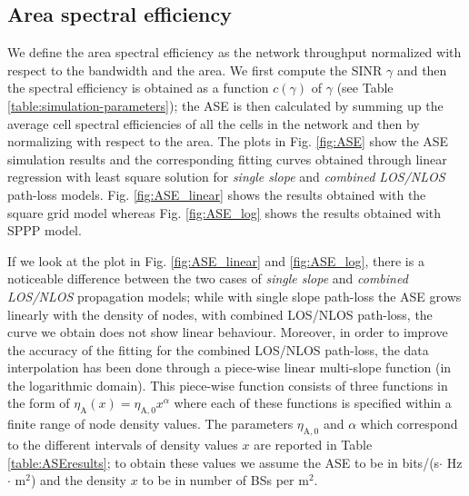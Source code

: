 \documentclass[twocoumn]{IEEEtran}
\begin{document}
\vspace{-5mm}
\subsection{Area spectral efficiency} \label{sub:Area_Spectral_Efficiency}

We define the area spectral efficiency as the network throughput normalized with respect to the bandwidth and the area. We first compute the SINR $\gamma$ and then the spectral efficiency is obtained as a
function $c(\gamma)$ of $\gamma$ (see Table \ref{table:simulation-parameters});
the ASE is then calculated by summing up the average cell spectral efficiencies of all the cells in the network  and then by normalizing with respect to the area. The plots in Fig. \ref{fig:ASE} show the ASE simulation results and the corresponding fitting curves obtained through linear regression with least square solution for \textit{single slope} and \textit{combined LOS/NLOS} path-loss models. Fig. \ref{fig:ASE_linear} shows the results obtained with the square grid model whereas Fig. \ref{fig:ASE_log} shows the results obtained with SPPP model.

\begin{figure*}[]
\centering
\hspace{1em}
\caption{ASE vs cell density: square grid (a) and SPPP based model (b).}
\label{fig:ASE}
\vspace{-6mm}
\end{figure*}

If we look at the plot in Fig. \ref{fig:ASE_linear} and \ref{fig:ASE_log}, there is a noticeable  difference  between the two cases of \textit{single slope} and \textit{combined LOS/NLOS} propagation models; while with single slope path-loss the ASE grows linearly with the density of nodes, with combined LOS/NLOS path-loss, the curve we obtain does not show linear behaviour. 
Moreover, in order to improve the accuracy of the fitting for the combined LOS/NLOS path-loss, the data interpolation has been done through a piece-wise linear multi-slope function (in the logarithmic domain).
This piece-wise function consists of three functions in the form of
$\eta_{\mathrm{A}}(x)=\eta_{\mathrm{A},0}x^{\alpha}$ where each of these functions
is specified within a finite range of node density values. The parameters
$\eta_{\mathrm{A},0}$ and $\alpha$ which correspond to the different
intervals of density values $x$ are reported in Table \ref{table:ASEresults}; to obtain these values we assume the ASE to be in bits/(s$\cdot$ Hz $\cdot$ m$^2$) and the density $x$ to be in number of BSs per m$^2$.
\end{document}
